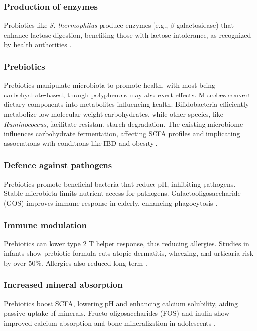\subsubsection*{Production of enzymes}
Probiotics like \textit{S. thermophilus} produce enzymes (e.g., $\beta$-galactosidase) that enhance lactose digestion, benefiting those with lactose intolerance, as recognized by health authorities \cite*{L10-Pro_Pre}.

\subsubsection*{Prebiotics}
Prebiotics manipulate microbiota to promote health, with most being carbohydrate-based, though polyphenols may also exert effects. Microbes convert dietary components into metabolites influencing health. Bifidobacteria efficiently metabolize low molecular weight carbohydrates, while other species, like \textit{Ruminococcus}, facilitate resistant starch degradation. The existing microbiome influences carbohydrate fermentation, affecting SCFA profiles and implicating associations with conditions like IBD and obesity \cite*{L10-Pro_Pre}.

\subsubsection*{Defence against pathogens}
Prebiotics promote beneficial bacteria that reduce pH, inhibiting pathogens. Stable microbiota limits nutrient access for pathogens. Galactooligosaccharide (GOS) improves immune response in elderly, enhancing phagocytosis \cite*{L10-Pro_Pre}.

\subsubsection*{Immune modulation}
Prebiotics can lower type 2 T helper response, thus reducing allergies. Studies in infants show prebiotic formula cuts atopic dermatitis, wheezing, and urticaria risk by over 50\%. Allergies also reduced long-term \cite*{L10-Pro_Pre}.

\subsubsection*{Increased mineral absorption}
Prebiotics boost SCFA, lowering pH and enhancing calcium solubility, aiding passive uptake of minerals. Fructo-oligosaccharides (FOS) and inulin show improved calcium absorption and bone mineralization in adolescents \cite*{L10-Pro_Pre}.


